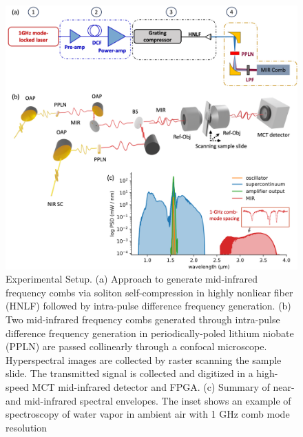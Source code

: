\documentclass[aip,reprint]{revtex4-1}
\begin{document}
\begin{figure}[!h]
    \centering
    \includegraphics[width=\linewidth]{setup_3D_v3.png}
    \caption{Experimental Setup. (a) Approach to generate mid-infrared frequency combs via soliton self-compression in highly nonliear fiber (HNLF) followed by intra-pulse difference frequency generation. (b) Two mid-infrared frequency combs generated through intra-pulse difference frequency generation in periodically-poled lithium niobate (PPLN) are passed collinearly through a confocal microscope. Hyperspectral images are collected by raster scanning the sample slide. The transmitted signal is collected and digitized in a high-speed MCT mid-infrared detector and FPGA. (c) Summary of near- and mid-infrared spectral envelopes.  The inset shows an example of spectroscopy of water vapor in ambient air with 1 GHz comb mode resolution}
    \label{fig:setup}
\end{figure}
\end{document}
